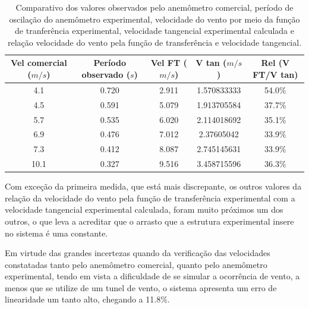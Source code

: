 \documentclass[a4paper]{instrumentacao}
\begin{document}
\begin{table}[H]
\centering
\caption{Comparativo dos valores observados pelo anemômetro comercial, período de oscilação do anemômetro experimental, velocidade do vento por meio da função de tranferência experimental, velocidade tangencial experimental calculada e relação velocidade do vento pela função de transferência e velocidade tangencial.}
\label{tab:anemometro-comparativo-vtf-vtan}
\begin{tabular}{|c|c|c|c|c|}
\hline
\textbf{Vel comercial ($m/s$)} & \textbf{Período observado ($s$)} & \textbf{Vel FT ($m/s$)} & \textbf{V tan ($m/s$)} & \textbf{Rel (V FT/V tan)} \\ \hline
4.1                           & 0.720                          & 2.911                  & 1.570833333           & 54.0\%                      \\ \hline
4.5                           & 0.591                          & 5.079                  & 1.913705584           & 37.7\%                      \\ \hline
5.7                           & 0.535                          & 6.020                  & 2.114018692           & 35.1\%                      \\ \hline
6.9                           & 0.476                          & 7.012                  & 2.37605042            & 33.9\%                      \\ \hline
7.3                           & 0.412                          & 8.087                  & 2.745145631           & 33.9\%                      \\ \hline
10.1                          & 0.327                          & 9.516                  & 3.458715596           & 36.3\%                      \\ \hline
\end{tabular}
\end{table}

Com exceção da primeira medida, que está mais discrepante, os outros valores da relação da velocidade do vento pela função de transferência experimental com a velocidade tangencial experimental calculada, foram muito próximos um dos outros, o que leva a acreditar que o arrasto que a estrutura experimental insere no sistema é uma constante.

Em virtude das grandes incertezas quando da verificação das velocidades constatadas tanto pelo anemômetro comercial, quanto pelo anemômetro experimental, tendo em vista a dificuldade de se simular a ocorrência de vento, a menos que se utilize de um tunel de vento, o sistema apresenta um erro de linearidade um tanto alto, chegando a 11.8$\%$.
\end{document}
